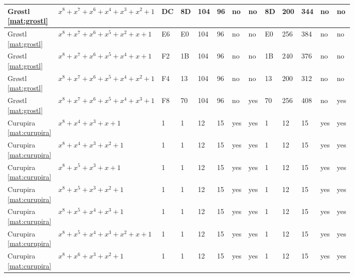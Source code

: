 \begin{tiny}
\begin{longtable}{|l|l|l|l|l|l|l|l|l|l|l|l|l|}
\shortstack{Gr{\o}stl \\ \eqref{mat:grostl}} & $x^8 + x^7 + x^6 + x^4 + x^3 + x^2 + 1$ & DC & 8D & 104 & 96 & no & no & 8D & 200 & 344 & no & no \\ \hline
\shortstack{Gr{\o}stl \\ \eqref{mat:grostl}} & $x^8 + x^7 + x^6 + x^5 + x^2 + x + 1$ & E6 & E0 & 104 & 96 & no & no & E0 & 256 & 384 & no & no \\ \hline
\shortstack{Gr{\o}stl \\ \eqref{mat:grostl}} & $x^8 + x^7 + x^6 + x^5 + x^4 + x + 1$ & F2 & 1B & 104 & 96 & no & no & 1B & 240 & 376 & no & no \\ \hline
\shortstack{Gr{\o}stl \\ \eqref{mat:grostl}} & $x^8 + x^7 + x^6 + x^5 + x^4 + x^2 + 1$ & F4 & 13 & 104 & 96 & no & no & 13 & 200 & 312 & no & no \\ \hline
\shortstack{Gr{\o}stl \\ \eqref{mat:grostl}} & $x^8 + x^7 + x^6 + x^5 + x^4 + x^3 + 1$ & F8 & 70 & 104 & 96 & no & yes & 70 & 256 & 408 & no & yes \\ \hline
\shortstack{Curupira \\ \eqref{mat:curupira}} & $x^8 + x^4 + x^3 + x + 1$ & 1 & 1 & 12 & 15 & yes & yes & 1 & 12 & 15 & yes & yes \\ \hline
\shortstack{Curupira \\ \eqref{mat:curupira}} & $x^8 + x^4 + x^3 + x^2 + 1$ & 1 & 1 & 12 & 15 & yes & yes & 1 & 12 & 15 & yes & yes \\ \hline
\shortstack{Curupira \\ \eqref{mat:curupira}} & $x^8 + x^5 + x^3 + x + 1$ & 1 & 1 & 12 & 15 & yes & yes & 1 & 12 & 15 & yes & yes \\ \hline
\shortstack{Curupira \\ \eqref{mat:curupira}} & $x^8 + x^5 + x^3 + x^2 + 1$ & 1 & 1 & 12 & 15 & yes & yes & 1 & 12 & 15 & yes & yes \\ \hline
\shortstack{Curupira \\ \eqref{mat:curupira}} & $x^8 + x^5 + x^4 + x^3 + 1$ & 1 & 1 & 12 & 15 & yes & yes & 1 & 12 & 15 & yes & yes \\ \hline
\shortstack{Curupira \\ \eqref{mat:curupira}} & $x^8 + x^5 + x^4 + x^3 + x^2 + x + 1$ & 1 & 1 & 12 & 15 & yes & yes & 1 & 12 & 15 & yes & yes \\ \hline
\shortstack{Curupira \\ \eqref{mat:curupira}} & $x^8 + x^6 + x^3 + x^2 + 1$ & 1 & 1 & 12 & 15 & yes & yes & 1 & 12 & 15 & yes & yes \\ \hline

\end{longtable}
\end{tiny}
